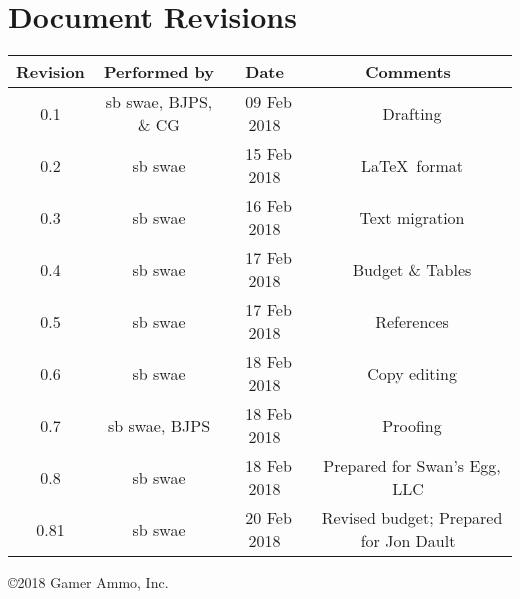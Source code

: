 \documentclass[11pt]{report}
\begin{document}
\chapter{Document Revisions}
\centering
\begin{tabular}{ || c | c | c | c ||}\hline \hline
  Revision & Performed by & Date & Comments \\ \hline\hline
0.1 & sb swae, BJPS, \& CG & \ 09 Feb 2018 & \ Drafting \\ \hline
0.2 & sb swae & \ 15 Feb 2018 & \ \LaTeX \  format \\ \hline
0.3 & sb swae & \ 16 Feb 2018 & \ Text migration \\ \hline
0.4 & sb swae & \ 17 Feb 2018 & \ Budget \& Tables \\ \hline
0.5 & sb swae & \ 17 Feb 2018 & \ References \\ \hline
0.6 & sb swae & \ 18 Feb 2018 & \ Copy editing \\ \hline
0.7 & sb swae, BJPS & \ 18 Feb 2018 & \ Proofing  \\ \hline
0.8 & sb swae & \ 18 Feb 2018 & \ Prepared for Swan's Egg, LLC  \\ \hline
0.81 \label{tab:current-revision} & sb swae & \ 20 Feb 2018 & \ Revised budget; Prepared for Jon Dault  \\ \hline \hline
\end{tabular}
\newline
\newline
\newline
\centering \copyright 2018 Gamer Ammo, Inc.
\end{document}
